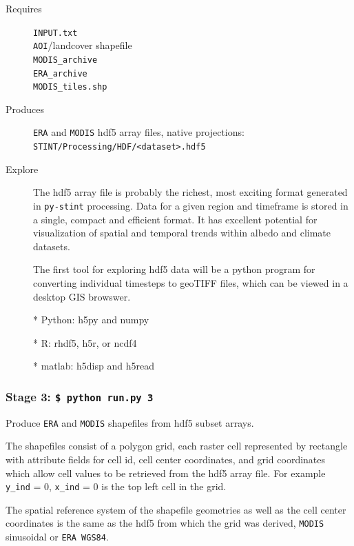 \documentclass[twoside,a4paper]{refart}
\begin{document}
  \begin{description}
    \item [Requires]
          \texttt{INPUT.txt} \\
          \texttt{AOI}/landcover shapefile \\
          \texttt{MODIS\_archive} \\
          \texttt{ERA\_archive} \\
          \texttt{MODIS\_tiles.shp}
  
  
    \item [Produces]
      \texttt{ERA} and \texttt{MODIS} hdf5 array files, native projections:\\
      \texttt{STINT/Processing/HDF/<dataset>.hdf5}
      

    \item [Explore]
      The hdf5 array file is probably the richest, most exciting format 
      generated in \texttt{py-stint} processing. Data for a given region 
      and timeframe is stored in a single, compact and efficient format. 
      It has excellent potential for visualization of spatial and temporal 
      trends within albedo and climate datasets. 
      
      The first tool for exploring hdf5 data will be a python program for
       converting individual timesteps to geoTIFF files, which can be 
       viewed in a desktop GIS browswer.
      
      
      * Python: h5py and numpy
      
      * R: rhdf5, h5r, or ncdf4 
      
      * matlab: h5disp and h5read
  \end{description}


\subsubsection{\textbf{Stage 3:} \texttt{\$ python run.py 3}}
Produce \texttt{ERA} and \texttt{MODIS} shapefiles from hdf5 subset arrays.
 
The shapefiles consist of a polygon grid, each raster cell represented by
rectangle with attribute fields for cell id, cell center coordinates, and grid coordinates which allow cell values to be retrieved from the hdf5 array file.  For example  \texttt{y\_ind} = 0, \texttt{x\_ind} = 0 is the top left cell in the grid.
 
The spatial reference system of the shapefile geometries as well as the cell center coordinates is the same as the hdf5 from which the grid was derived, \texttt{MODIS} sinusoidal or \texttt{ERA WGS84}.
\end{document}

